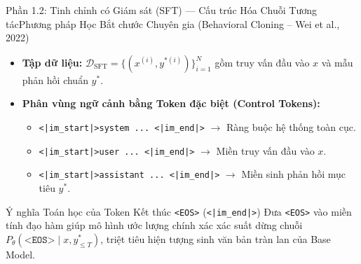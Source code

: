 \begin{frame}{Phần 1.2: Tinh chỉnh có Giám sát (SFT) --- Cấu trúc Hóa Chuỗi Tương tác}{Phương pháp Học Bắt chước Chuyên gia (Behavioral Cloning -- Wei et al., 2022)}
  \small
  \begin{itemize}\setlength{\itemsep}{6pt}
    \item \textbf{Tập dữ liệu:} $\mathcal{D}_{\text{SFT}} = \{(x^{(i)}, y^{*(i)})\}_{i=1}^{N}$ gồm truy vấn đầu vào $x$ và mẫu phản hồi chuẩn $y^*$.
    \item \textbf{Phân vùng ngữ cảnh bằng Token đặc biệt (Control Tokens):}
      \begin{itemize}\footnotesize\setlength{\itemsep}{3pt}
        \item \texttt{<|im\_start|>system ... <|im\_end|>} $\longrightarrow$ Ràng buộc hệ thống toàn cục.
        \item \texttt{<|im\_start|>user ... <|im\_end|>} $\longrightarrow$ Miền truy vấn đầu vào $x$.
        \item \texttt{<|im\_start|>assistant ... <|im\_end|>} $\longrightarrow$ Miền sinh phản hồi mục tiêu $y^*$.
      \end{itemize}
  \end{itemize}

  \vspace{0.1cm}
  \begin{exampleblock}{Ý nghĩa Toán học của Token Kết thúc \texttt{<EOS>} (\texttt{<|im\_end|>})}
    \footnotesize
    Đưa \texttt{<EOS>} vào miền tính đạo hàm giúp mô hình ước lượng chính xác xác suất dừng chuỗi $P_\theta(\texttt{<EOS>} \mid x, y_{\le T}^*)$, triệt tiêu hiện tượng sinh văn bản tràn lan của Base Model.
  \end{exampleblock}
\end{frame}

